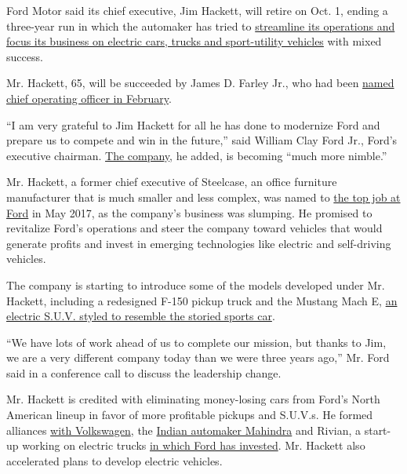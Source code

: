 Ford Motor said its chief executive, Jim Hackett, will retire on Oct. 1,
ending a three-year run in which the automaker has tried to
\href{https://www.nytimes.com/2018/06/17/business/ford-detroit-station.html}{streamline
its operations and focus its business on electric cars, trucks and
sport-utility vehicles} with mixed success.

Mr. Hackett, 65, will be succeeded by James D. Farley Jr., who had been
\href{https://www.nytimes.com/2020/02/07/business/ford-motor-jim-farley.html}{named
chief operating officer in February}.

``I am very grateful to Jim Hackett for all he has done to modernize
Ford and prepare us to compete and win in the future,'' said William
Clay Ford Jr., Ford's executive chairman.
\href{https://www.nytimes.com/topic/company/ford-motor-company}{The
company}, he added, is becoming ``much more nimble.''

Mr. Hackett, a former chief executive of Steelcase, an office furniture
manufacturer that is much smaller and less complex, was named to
\href{https://www.nytimes.com/2017/05/22/business/jim-hackett-ford.html}{the
top job at Ford} in May 2017, as the company's business was slumping. He
promised to revitalize Ford's operations and steer the company toward
vehicles that would generate profits and invest in emerging technologies
like electric and self-driving vehicles.

The company is starting to introduce some of the models developed under
Mr. Hackett, including a redesigned F-150 pickup truck and the Mustang
Mach E,
\href{https://www.nytimes.com/2019/11/17/business/ford-mustang-electric-suv.html}{an
electric S.U.V. styled to resemble the storied sports car}.

``We have lots of work ahead of us to complete our mission, but thanks
to Jim, we are a very different company today than we were three years
ago,'' Mr. Ford said in a conference call to discuss the leadership
change.

Mr. Hackett is credited with eliminating money-losing cars from Ford's
North American lineup in favor of more profitable pickups and S.U.V.s.
He formed alliances
\href{https://www.nytimes.com/2019/07/05/business/ford-vw-self-driving-electric-cars.html}{with
Volkswagen}, the
\href{https://www.nytimes.com/2019/10/01/business/ford-india.html}{Indian
automaker Mahindra} and Rivian, a start-up working on electric trucks
\href{https://www.nytimes.com/2019/04/24/business/ford-rivian-investment.html}{in
which Ford has invested}. Mr. Hackett also accelerated plans to develop
electric vehicles.

